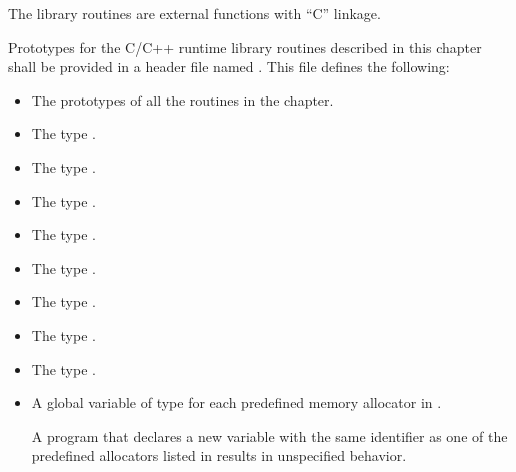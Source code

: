 \begin{ccppspecific}
The library routines are external functions with ``C'' linkage.

Prototypes for the C/C++ runtime library routines described in this chapter shall be
provided in a header file named . This file defines the following:

\begin{itemize}
\item The prototypes of all the routines in the chapter.

\item The type .

\item The type .

\item The type .

\item The type .

\item The type .

\item The type .

\item The type .

\item The type .

\item A global variable of type  for each predefined memory allocator in .

A program that declares a new variable with the same identifier as one of the predefined allocators listed in  results in unspecified behavior.

\end{itemize}


\end{ccppspecific}

